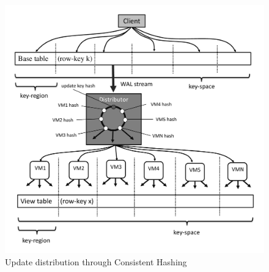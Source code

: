 \begin{figure}
  \centering
    \includegraphics[width=\linewidth]{figures/Consistency}
    \caption{Update distribution through Consistent Hashing}
    \label{fig:review_consistency}
    \vspace{-2mm}
\end{figure}


